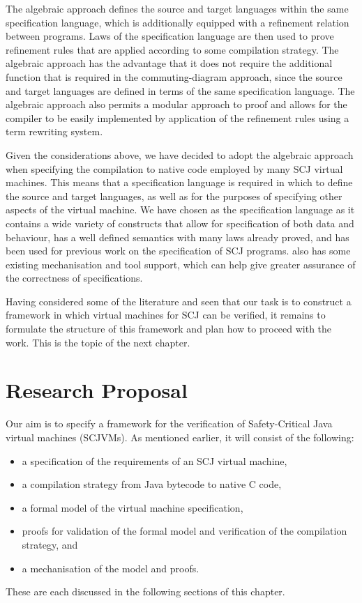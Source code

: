 \documentclass[a4paper,10pt]{report}
\begin{document}
The algebraic approach defines the source and target languages within the same
specification language, which is additionally equipped with a refinement
relation between programs.  Laws of the specification language are then used to
prove refinement rules that are applied according to some compilation strategy.
The algebraic approach has the advantage that it does not require the additional
function that is required in the commuting-diagram approach, since the source
and target languages are defined in terms of the same specification language.
The algebraic approach also permits a modular approach to proof and allows for
the compiler to be easily implemented by application of the refinement rules
using a term rewriting system.

Given the considerations above, we have decided to adopt the algebraic approach
when specifying the compilation to native code employed by many SCJ virtual
machines.  This means that a specification language is required in which to
define the source and target languages, as well as for the purposes of
specifying other aspects of the virtual machine.  We have chosen \Circus{} as
the specification language as it contains a wide variety of constructs that
allow for specification of both data and behaviour, has a well defined semantics
with many laws already proved, and has been used for previous work on the
specification of SCJ programs. \Circus{} also has some existing mechanisation
and tool support, which can help give greater assurance of the correctness of
specifications.

Having considered some of the literature and seen that our task is to construct
a framework in which virtual machines for SCJ can be verified, it remains to
formulate the structure of this framework and plan how to proceed with the
work.  This is the topic of the next chapter.

\chapter{Research Proposal}
\label{research-proposal-chapter}


Our aim is to specify a framework for the verification of Safety-Critical Java
virtual machines (SCJVMs).  As mentioned earlier, it will consist of the
following:  
\begin{itemize}
\item a specification of the requirements of an SCJ virtual machine,
\item a compilation strategy from Java bytecode to native C code,
\item a formal model of the virtual machine specification,
\item proofs for validation of the formal model and verification of the
  compilation strategy, and
\item a mechanisation of the model and proofs.
\end{itemize}
These are each discussed in the following sections of this chapter.
\end{document}
